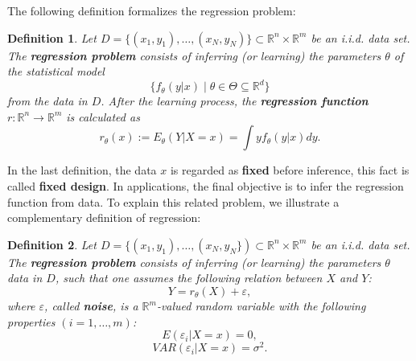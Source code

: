 \documentclass{report}
\newtheorem{definition}{Definition}[chapter]
\begin{document}
The following definition formalizes the regression problem: 

\begin{definition}
Let $D = \{(x_1,y_1),\dots,(x_N,y_N)\} \subset \mathbb{R}^n \times \mathbb{R}^m$ be an i.i.d. data set. The \textbf{regression problem} consists of inferring (or learning) the parameters $\theta$ of the statistical model
\begin{equation}
\{f_\theta(y|x) \mid \theta \in \Theta \subseteq \mathbb{R}^d\}
\end{equation}
from the data in $D$. After the learning process, the \textbf{regression function} $r : \mathbb{R}^n \to \mathbb{R}^m$ is calculated as
\begin{equation}
 r_\theta(x) := E_\theta(Y|X = x) = \int yf_\theta(y|x)dy.
\end{equation}
\end{definition}

In the last definition, the data $x$ is regarded as \textbf{fixed} before inference, this fact is called \textbf{fixed design}. In applications, the final objective is to infer the regression function from data. To explain this related problem, we illustrate a complementary definition of regression:

\begin{definition}
Let $D = \{(x_1,y_1),\dots,(x_N,y_N\}) \subset \mathbb{R}^n \times \mathbb{R}^m$ be an i.i.d. data set. The \textbf{regression problem} consists of inferring (or learning) the parameters $\theta$ data in $D$, such that one assumes the following relation between $X$ and $Y$:
\begin{equation}
Y = r_\theta(X) + \varepsilon,
\end{equation}
where $\varepsilon$, called \textbf{noise}, is a $\mathbb{R}^m$-valued random variable with the following properties $(i = 1,\dots,m)$:
\begin{equation}
E(\varepsilon_i|X = x) = 0,
\end{equation}
\begin{equation}
VAR(\varepsilon_i|X = x) = \sigma^2.
\end{equation}
\end{definition}
\end{document}
